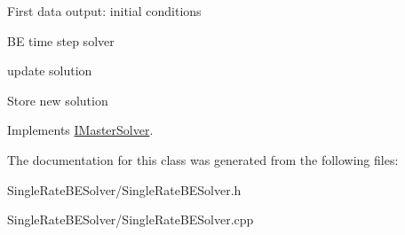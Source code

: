 First data output: initial conditions

BE time step solver

update solution

Store new solution 

Implements \hyperlink{classIMasterSolver}{IMasterSolver}.

The documentation for this class was generated from the following files:\begin{DoxyCompactItemize}
\item 
SingleRateBESolver/SingleRateBESolver.h\item 
SingleRateBESolver/SingleRateBESolver.cpp\end{DoxyCompactItemize}
